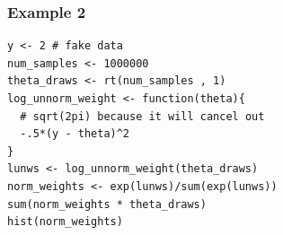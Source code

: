 \documentclass{beamer}
\begin{document}
\begin{frame}[fragile]
\frametitle{Example 2}


\begin{verbatim}
y <- 2 # fake data
num_samples <- 1000000
theta_draws <- rt(num_samples , 1)
log_unnorm_weight <- function(theta){ 
  # sqrt(2pi) because it will cancel out 
  -.5*(y - theta)^2
}
lunws <- log_unnorm_weight(theta_draws)
norm_weights <- exp(lunws)/sum(exp(lunws))
sum(norm_weights * theta_draws)
hist(norm_weights)
\end{verbatim}


\end{frame}



% 
% 
% 
% 
% 
% 
% 
% 
% 
% 
\end{document}
